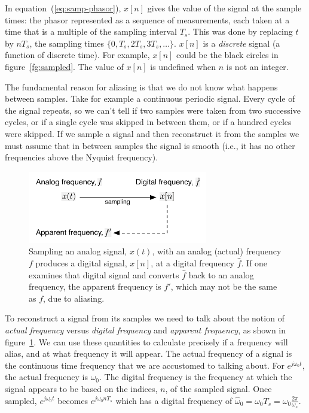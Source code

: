 In equation~(\ref{eq:samp-phasor}), $x[n]$ gives the value of the signal at the
sample times: the phasor represented as a sequence of measurements,
each taken at a time that is a multiple of the sampling interval
$T_s$. This was done by replacing $t$ by $nT_s$, the sampling times
$\{0, T_s, 2T_s, 3T_s, \ldots\}$. $x[n]$ is a \emph{discrete} signal
(a function of discrete time). For example, $x[n]$ could be the black circles in
figure~\ref{fg:sampled}. The value of $x[n]$ is undefined when $n$ is not an integer. 

The fundamental reason for aliasing is that we do not know what happens between samples. Take for example a continuous periodic signal. Every cycle of the signal repeats, so we can't tell if two
samples were taken from two successive cycles, or if a single cycle
was skipped in between them, or if a hundred cycles were
skipped. If we sample a signal and then reconstruct it from the samples we must assume that in between samples the signal is smooth (i.e., it has no other frequencies above the Nyquist frequency). 

\begin{figure}
  \centerline{\includegraphics[width=0.7\textwidth]{ch-computer/apparent-frequency}}
  \caption[Sampling and apparent frequency]{Sampling an analog signal,
    $x(t)$, with an analog (actual) frequency $f$ produces a digital
    signal, $x[n]$, at a digital frequency $\hat{f}$. If one examines
    that digital signal and converts $\hat{f}$ back to an analog
    frequency, the apparent frequency is $f'$, which may not be the
    same as $f$, due to aliasing.\label{fg:apparent-frequency}}
\end{figure}

To reconstruct a signal from its samples we need to talk about the
notion of \emph{actual frequency} versus \emph{digital frequency} and
\emph{apparent frequency}, as shown in
figure~\ref{fg:apparent-frequency}. We can use these quantities to
calculate precisely if a frequency will alias, and at what frequency
it will appear. The actual frequency of a signal is the continuous
time frequency that we are accustomed to talking about. For
$e^{j\omega_0 t}$, the actual frequency is $\omega_0$. The digital
frequency is the frequency at which the signal appears to be based on
the indices, $n$, of the sampled signal. Once sampled, $ e^{j\omega_0
  t}$ becomes $ e^{j\omega_0 nT_s}$ which has a digital frequency of
$\hat{\omega}_0=\omega_0 T_s=\omega_0 \frac{2\pi}{\omega_s}$.

